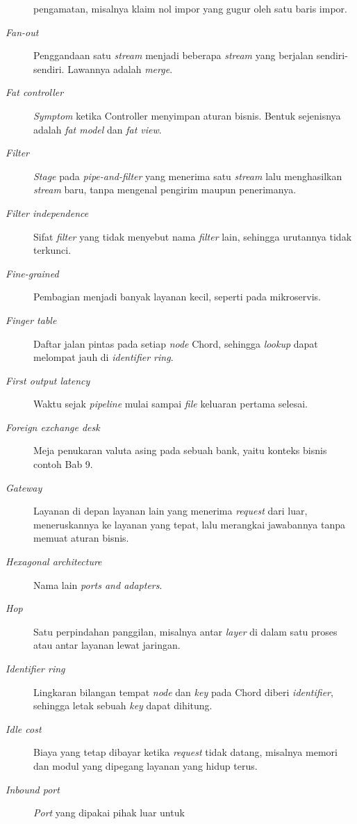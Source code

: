 \begin{description}
    pengamatan, misalnya klaim nol impor yang gugur oleh satu baris impor.
  \item[\textit{Fan-out}] Penggandaan satu \textit{stream} menjadi beberapa
    \textit{stream} yang berjalan sendiri-sendiri. Lawannya adalah
    \textit{merge}.
  \item[\textit{Fat controller}] \textit{Symptom} ketika Controller menyimpan
    aturan bisnis. Bentuk sejenisnya adalah \textit{fat model} dan \textit{fat
    view}.
  \item[\textit{Filter}] \textit{Stage} pada \textit{pipe-and-filter} yang
    menerima satu \textit{stream} lalu menghasilkan \textit{stream} baru, tanpa
    mengenal pengirim maupun penerimanya.
  \item[\textit{Filter independence}] Sifat \textit{filter} yang tidak menyebut
    nama \textit{filter} lain, sehingga urutannya tidak terkunci.
  \item[\textit{Fine-grained}] Pembagian menjadi banyak layanan kecil, seperti pada mikroservis.
  \item[\textit{Finger table}] Daftar jalan pintas pada setiap \textit{node}
    Chord, sehingga \textit{lookup} dapat melompat jauh di \textit{identifier
    ring}.
  \item[\textit{First output latency}] Waktu sejak \textit{pipeline} mulai
    sampai \textit{file} keluaran pertama selesai.
  \item[\textit{Foreign exchange desk}] Meja penukaran valuta asing pada
    sebuah bank, yaitu konteks bisnis contoh Bab 9.
  \item[\textit{Gateway}] Layanan di depan layanan lain yang menerima \textit{request} dari
    luar, meneruskannya ke layanan yang tepat, lalu merangkai jawabannya
    tanpa memuat aturan bisnis.
  \item[\textit{Hexagonal architecture}] Nama lain \textit{ports and
    adapters}.
  \item[\textit{Hop}] Satu perpindahan panggilan, misalnya antar \textit{layer}
    di dalam satu proses atau antar layanan lewat jaringan.
  \item[\textit{Identifier ring}] Lingkaran bilangan tempat \textit{node} dan
    \textit{key} pada Chord diberi \textit{identifier}, sehingga letak sebuah
    \textit{key} dapat dihitung.
  \item[\textit{Idle cost}] Biaya yang tetap dibayar ketika \textit{request}
    tidak datang, misalnya memori dan modul yang dipegang layanan yang hidup
    terus.
  \item[\textit{Inbound port}] \textit{Port} yang dipakai pihak luar untuk

\end{description}
